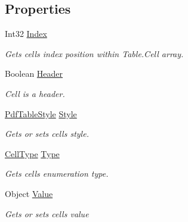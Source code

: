 \subsection*{Properties}
\begin{DoxyCompactItemize}
\item 
Int32 \hyperlink{class_pdf_file_writer_1_1_pdf_table_cell_a2986ee3dac40f0fb77f3e4e7c178687b}{Index}
\begin{DoxyCompactList}\small\item\em Gets cell\textquotesingle{}s index position within Table.\+Cell array. \end{DoxyCompactList}\item 
Boolean \hyperlink{class_pdf_file_writer_1_1_pdf_table_cell_ae09ce38bc8ed67891972db098e74660f}{Header}
\begin{DoxyCompactList}\small\item\em Cell is a header. \end{DoxyCompactList}\item 
\hyperlink{class_pdf_file_writer_1_1_pdf_table_style}{Pdf\+Table\+Style} \hyperlink{class_pdf_file_writer_1_1_pdf_table_cell_a34d92c5868a37dc6163997b3cef61229}{Style}
\begin{DoxyCompactList}\small\item\em Gets or sets cell\textquotesingle{}s style. \end{DoxyCompactList}\item 
\hyperlink{namespace_pdf_file_writer_a45e52c090a4d8e1333577773ec0bac4a}{Cell\+Type} \hyperlink{class_pdf_file_writer_1_1_pdf_table_cell_ab6e0b58cc352a094b9c9231c5c1b2a21}{Type}
\begin{DoxyCompactList}\small\item\em Gets cell\textquotesingle{}s enumeration type. \end{DoxyCompactList}\item 
Object \hyperlink{class_pdf_file_writer_1_1_pdf_table_cell_a00060b4a3d84008c9ff254240c1f5ce3}{Value}
\begin{DoxyCompactList}\small\item\em Gets or sets cell\textquotesingle{}s value \end{DoxyCompactList}\item 

\end{DoxyCompactItemize}
